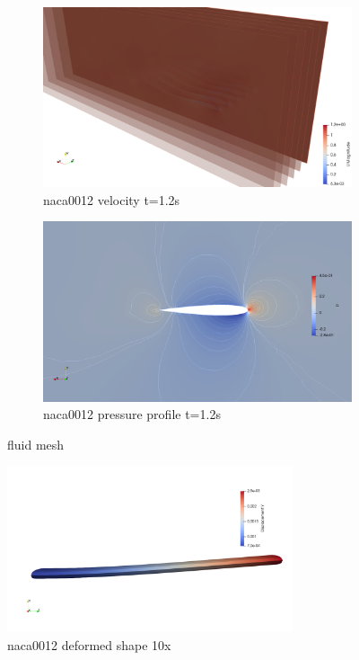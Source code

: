 \begin{figure}[htbp!]
	\centering
	\begin{subfigure}{.75\textwidth}
		\centering
		\includegraphics[width=.99\linewidth]{images/heathcote/naca0012_U.png}
		\caption{naca0012 velocity t=1.2s}
	\end{subfigure}
	\newline
	
	\centering
	\begin{subfigure}{.75\textwidth}
		\centering
		\includegraphics[width=.99\linewidth]{images/heathcote/naca0012_p.png}
		\caption{naca0012 pressure profile t=1.2s}
	\end{subfigure}
	\caption{fluid mesh}
	\label{fig:hc-mesh}
\end{figure}


\begin{figure}[htbp!]
	\centering
	\includegraphics[width=0.75\textwidth]{images/heathcote/naca0012_dy.png}
	\caption{naca0012 deformed shape 10x}
	\label{fig:hc-tip-disp}
\end{figure}


